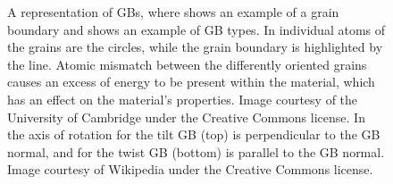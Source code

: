 \documentclass[12pt]{report}
\begin{document}
\begin{figure}[ht!]
 \centering
 
 \quad
 \quad
 \caption{\label{gbs} A representation of GBs, where \protect{} shows an example of a grain boundary and \protect{} shows an example of GB types.  In \protect{} individual atoms of the grains are the circles, while the grain boundary is highlighted by the line.  Atomic mismatch between the differently oriented grains causes an excess of energy to be present within the material, which has an effect on the material's properties.  Image courtesy of the University of Cambridge under the Creative Commons license. In \protect{} the axis of rotation for the tilt GB (top) is perpendicular to the GB normal, and for the twist GB (bottom) is parallel to the GB normal.  Image courtesy of Wikipedia under the Creative Commons license.}
\end{figure}
\end{document}
